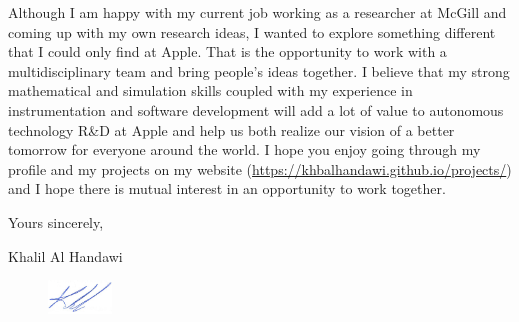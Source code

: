 \documentclass[12pt]{article} %
\begin{document}
Although I am happy with my current job working as a researcher at McGill and coming up with my own research ideas, I wanted to explore something different that I could only find at Apple. That is the opportunity to work with a multidisciplinary team and bring people's ideas together. I believe that my strong mathematical and simulation skills coupled with my experience in instrumentation and software development will add a lot of value to autonomous technology R\&D at Apple and help us both realize our vision of a better tomorrow for everyone around the world. I hope you enjoy going through my profile and my projects on my website (\href{https://khbalhandawi.github.io/projects/}{https://khbalhandawi.github.io/projects/}) and I hope there is mutual interest in an opportunity to work together.

\medskip %

Yours sincerely,

\medskip %

Khalil Al Handawi

\begin{figure}[h]
	\includegraphics[width=0.15\textwidth]{Signiture.png}
\end{figure}

\medskip %

\end{document}
